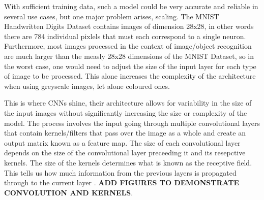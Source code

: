 With sufficient training data, such a model could be very accurate and reliable in several use cases, but one major problem arises, scaling. The MNIST Handwritten Digits Dataset contains images of dimension 28x28, in other words there are 784 individual pixlels that must each correspond to a single neuron. Furthermore, most images processed in the context of image/object recognition are much larger than the measly 28x28 dimensions of the MNIST Dataset, so in the worst case, one would need to adjust the size of the input layer for each type of image to be processed. This alone increases the complexity of the architecture when using greyscale images, let alone coloured ones.

This is where CNNs shine, their architecture allows for variability in the size of the input images without significantly increasing the size or complexity of the model. The process involves the input going through multiple convolutional layers that contain kernels/filters that pass over the image as a whole and create an output matrix known as a feature map. The size of each convolutional layer depends on the size of the convolutional layer preceeding it and its resepctive kernels. The size of the kernels determines what is known as the receptive field. This tells us how much information from the previous layers is propagated through to the current layer \cite{lecun2015deep}. \textbf{ADD FIGURES TO DEMONSTRATE CONVOLUTION AND KERNELS}.

